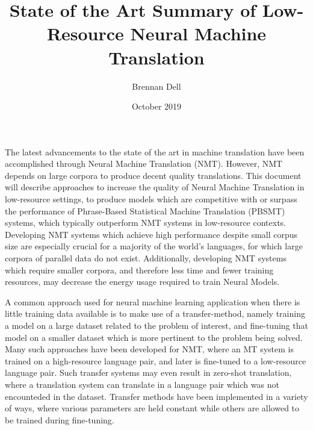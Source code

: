 \documentclass{article}
\title{State of the Art Summary of Low-Resource Neural Machine Translation}
\author{Brennan Dell }
\date{October 2019}
\begin{document}
\maketitle

The latest advancements to the state of the art in machine translation have been accomplished through Neural Machine Translation (NMT). However, NMT depends on large corpora to produce decent quality translations. This document will describe approaches to increase the quality of Neural Machine Translation in low-resource settings, to produce models which are competitive with or surpass the performance of Phrase-Based Statistical Machine Translation (PBSMT) systems, which typically outperform NMT systems in low-resource contexts. Developing NMT systems which achieve high performance despite small corpus size are especially crucial for a majority of the world's languages, for which large corpora of parallel data do not exist. Additionally, developing NMT systems which require smaller corpora, and therefore less time and fewer training resources, may decrease the energy usage required to train Neural Models.
\cite{strubell2019energy}

A common approach used for neural machine learning application when there is little training data available is to make use of a transfer-method, namely training a model on a large dataset related to the problem of interest, and fine-tuning that model on a smaller dataset which is more pertinent to the problem being solved. Many such approaches have been developed for NMT, where an MT system is trained on a high-resource language pair, and later is fine-tuned to a low-resource language pair. Such transfer systems may even result in zero-shot translation, where a translation system can translate in a language pair which was not encounteded in the dataset. Transfer methods have been implemented in a variety of ways, where various parameters are held constant while others are allowed to be trained during fine-tuning.
\end{document}
